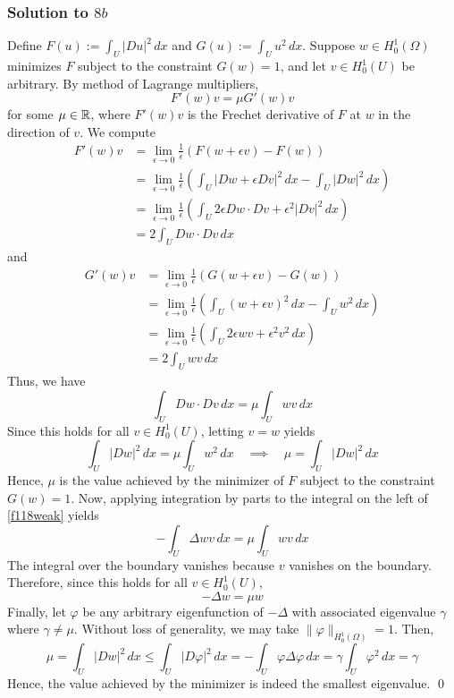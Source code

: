 \subsubsection*{Solution to $8b$}

Define $F(u) := \int_U |Du|^2 \, dx$ and $G(u) := \int_U u^2 \, dx$. Suppose $w \in H^1_0(\Omega)$ minimizes $F$ subject to the constraint $G(w) = 1$,  and let $v \in H_0^1(U)$ be arbitrary. By method of Lagrange multipliers,
$$ F'(w)v = \mu G'(w)v $$
for some $\mu \in \mathbb{R}$, where $F'(w)v$ is the Frechet derivative of $F$ at $w$ in the direction of $v$. We compute
\begin{align*}
F'(w)v &= \lim_{\epsilon \to 0} \frac{1}{\epsilon} \left(F(w+\epsilon v)-F(w)\right) \\
&= \lim_{\epsilon \to 0} \frac{1}{\epsilon} \left( \int_U |Dw+ \epsilon Dv|^2 \, dx - \int_U |Dw|^2 \, dx \right)	\\
&= \lim_{\epsilon \to 0} \frac{1}{\epsilon} \left( \int_U 2\epsilon Dw \cdot Dv + \epsilon^2 |Dv|^2 \, dx \right) \\
&= 2 \int_U Dw \cdot Dv \, dx
\end{align*}
and
\begin{align*}
G'(w)v &= \lim_{\epsilon \to 0} \frac{1}{\epsilon} (G(w + \epsilon v) - G(w)) \\
&= \lim_{\epsilon \to 0} \frac{1}{\epsilon} \left( \int_U (w+\epsilon v)^2 \, dx - \int_U w^2 \, dx \right) \\
&= \lim_{\epsilon \to 0} \frac{1}{\epsilon} \left( \int_U 2 \epsilon wv + \epsilon^2 v^2 \, dx \right) \\
&= 2 \int_U wv \, dx
\end{align*}
Thus, we have
\begin{equation}
\label{f118weak}
	\int_U Dw \cdot Dv \, dx = \mu \int_U wv \, dx
\end{equation}
Since this holds for all $v \in H_0^1(U)$, letting $v=w$ yields
$$ \int_U |Dw|^2 \, dx = \mu \int_U w^2 \, dx \quad \implies \quad \mu = \int_{U} |Dw|^2 \, dx $$
Hence, $\mu$ is the value achieved by the minimizer of $F$ subject to the constraint $G(w)=1$. Now, applying integration by parts to the integral on the left of \eqref{f118weak} yields
$$ -\int_U \Delta w v \, dx = \mu \int_U wv \,dx $$
The integral over the boundary vanishes because $v$ vanishes on the boundary. Therefore, since this holds for all $v \in H_0^1(U)$,
$$ -\Delta w = \mu w $$
Finally, let $\varphi$ be any arbitrary eigenfunction of $-\Delta$ with associated eigenvalue $\gamma$ where $\gamma \neq \mu$. Without loss of generality, we may take $\|\varphi\|_{H^1_0(\Omega)} = 1$. Then,
$$ \mu = \int_U |Dw|^2 \, dx \leq \int_U |D\varphi|^2 \, dx = -\int_U \varphi \Delta \varphi \, dx = \gamma \int_U \varphi^2 \, dx = \gamma $$
Hence, the value achieved by the minimizer is indeed the smallest eigenvalue. \hfill \qed
